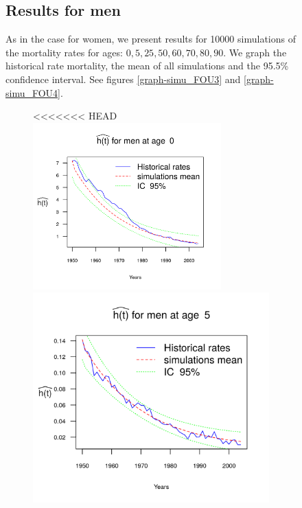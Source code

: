 \documentclass[smallextended]{svjour3}
\begin{document}
\begin{figure}[H]
\subsection{Results for men}\label{re-men}

As in the case for women, we present results for 10000 simulations of the
mortality rates for ages: $0,5,25,50,60,70,80,90$.
We graph the historical rate mortality, the mean of all simulations and the
95.5\% confidence interval. See figures \ref{graph-simu_FOU3} and
\ref{graph-simu_FOU4}.

\begin{figure}[H]
<<<<<<< HEAD
    \includegraphics[width = 2.85in]{PlotMen0.png}
    \includegraphics{PlotMen5.png}

\end{figure}
\end{figure}
\end{document}
